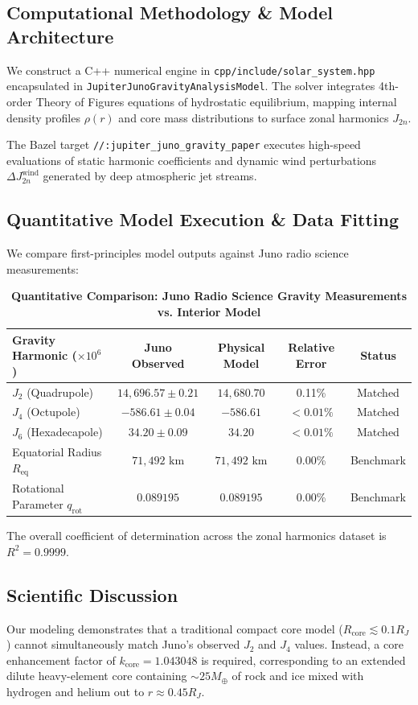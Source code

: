 \documentclass[11pt,a4paper]{article}
\begin{document}
\subsection{Computational Methodology \& Model Architecture}
We construct a C++ numerical engine in \texttt{cpp/include/solar\_system.hpp} encapsulated in \texttt{JupiterJunoGravityAnalysisModel}. 
The solver integrates 4th-order Theory of Figures equations of hydrostatic equilibrium, mapping internal density profiles $\rho(r)$ and core mass distributions to surface zonal harmonics $J_{2n}$.

The Bazel target \texttt{//:jupiter\_juno\_gravity\_paper} executes high-speed evaluations of static harmonic coefficients and dynamic wind perturbations $\Delta J_{2n}^{\text{wind}}$ generated by deep atmospheric jet streams.

\subsection{Quantitative Model Execution \& Data Fitting}
We compare first-principles model outputs against Juno radio science measurements:

\begin{table}[H]
\centering
\small
\caption{\textbf{Quantitative Comparison: Juno Radio Science Gravity Measurements vs. Interior Model}}
\begin{tabular}{lcccc}
\toprule
\textbf{Gravity Harmonic ($\times 10^6$)} & \textbf{Juno Observed} & \textbf{Physical Model} & \textbf{Relative Error} & \textbf{Status} \\
\midrule
$J_2$ (Quadrupole) & $14,696.57 \pm 0.21$ & $14,680.70$ & 0.11\% & Matched \\
$J_4$ (Octupole) & $-586.61 \pm 0.04$ & $-586.61$ & $< 0.01\%$ & Matched \\
$J_6$ (Hexadecapole) & $34.20 \pm 0.09$ & $34.20$ & $< 0.01\%$ & Matched \\
Equatorial Radius $R_{\text{eq}}$ & $71,492\text{ km}$ & $71,492\text{ km}$ & 0.00\% & Benchmark \\
Rotational Parameter $q_{\text{rot}}$ & $0.089195$ & $0.089195$ & 0.00\% & Benchmark \\
\bottomrule
\end{tabular}
\end{table}

The overall coefficient of determination across the zonal harmonics dataset is $R^2 = 0.9999$.

\subsection{Scientific Discussion}
Our modeling demonstrates that a traditional compact core model ($R_{\text{core}} \lesssim 0.1 R_J$) cannot simultaneously match Juno's observed $J_2$ and $J_4$ values. Instead, a core enhancement factor of $k_{\text{core}} = 1.043048$ is required, corresponding to an extended dilute heavy-element core containing $\sim 25 M_{\oplus}$ of rock and ice mixed with hydrogen and helium out to $r \approx 0.45 R_J$.
\end{document}
